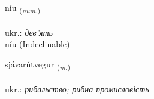 \documentclass[frontgrid, backgrid]{flacards}\usepackage[]{graphicx}\usepackage[]{xcolor}
\begin{document}

\renewcommand{\flhead}{\vskip5pt \fboxsep=0pt {\small\bfseries\footnotesize Töluorð | чисельник}}
\renewcommand{\fcfoot}{\vskip5pt \fboxsep=0pt \hspace{2pt}{\small\bfseries\footnotesize 2K}}

\renewcommand{\blhead}{\vskip5pt {\small\bfseries\footnotesize Töluorð | чисельник }}
\renewcommand{\bcfoot}{\vskip5pt \hspace{2pt}{\small\bfseries\footnotesize 2K}}


{níu \small{\textsubscript{(\textit{num.})}} \\[1ex]
\textphonetic{[niːʏ]} \\
ukr.: \emph{дев'ять} \\  [2ex]
níu (Indeclinable)}

\renewcommand{\flhead}{\vskip5pt \fboxsep=0pt {\small\bfseries\footnotesize Nafnorð | іменник}}
\renewcommand{\fcfoot}{\vskip5pt \fboxsep=0pt \hspace{2pt}{\small\bfseries\footnotesize 2K}}

\renewcommand{\blhead}{\vskip5pt {\small\bfseries\footnotesize Nafnorð | іменник }}
\renewcommand{\bcfoot}{\vskip5pt \hspace{2pt}{\small\bfseries\footnotesize 2K}}


{sjávarútvegur \small{\textsubscript{(\textit{m.})}} \\[1ex] %
\textphonetic{[sjauːvarutvɛɣʏr]} \\
ukr.: \emph{рибальство; рибна промисловість} \\  [2ex]
\renewcommand*{\arraystretch}{0.8}
}

\renewcommand{\flhead}{\vskip5pt \fboxsep=0pt {\small\bfseries\footnotesize Nafnorð | іменник}}
\renewcommand{\fcfoot}{\vskip5pt \fboxsep=0pt \hspace{2pt}{\small\bfseries\footnotesize 2K}}
\end{document}
